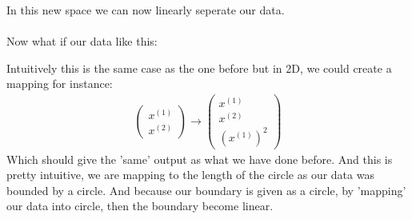 In this new space we can now linearly seperate our data.\\
$ $\\
Now what if our data like this:
\begin{center}
    


\end{center}


Intuitively this is the same case as the one before but in 2D, we could create a mapping for instance:
\begin{align*} 
	\begin{pmatrix} x^{\left(1\right)} \\ x^{\left(2\right)} \end{pmatrix}  \to \begin{pmatrix} x^{\left(1\right)} \\ x^{\left(2\right)} \\ \left(x^{\left(1\right)}\right)^2 \end{pmatrix} 
\end{align*}
Which should give the 'same' output as what we have done before. And this is pretty intuitive, we are mapping to the length of the circle as our data was bounded by a circle. And because our boundary is given as a circle, by 'mapping' our data into circle, then the boundary become linear.

\pgfplotsset{compat=1.18}

